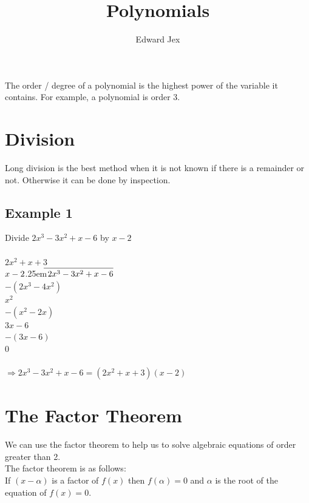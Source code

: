 \documentclass[a4paper,12pt]{article}
\newcommand\longdiv[2]{%
$\strut#1$\kern.25em\smash{\raise.3ex\hbox{$\big)$}}$\mkern-8mu
        \overline{\enspace\strut#2}$}
\begin{document}
\title{Polynomials}	
\author{Edward Jex}
\maketitle

The order / degree of a polynomial is the highest power of the variable it contains. For example, a polynomial is order 3. \\
\section*{Division}
Long division is the best method when it is not known if there is a remainder or not. Otherwise it can  be done by inspection. \\
\subsection*{Example 1}
Divide $2x^3 -3x^2 + x -6$ by $x-2$ \\\\
\phantom{A}\hspace{0.8cm} $2x^2 + x + 3$ \\
\longdiv{x-2}{2x^3 -3x^2 + x -6} \\
\phantom{A}\hspace{0.3cm} $-(2x^3 -4x^2)$ \\
\phantom{A}\hspace{2.1cm} $x^2$ \\
\phantom{A}\hspace{1.6cm} $-(x^2-2x)$ \\
\phantom{A}\hspace{3cm} $3x-6$ \\
\phantom{A}\hspace{2.5cm} $-(3x-6)$ \\
\phantom{A}\hspace{4cm} $0$ \\\\
$\Rightarrow 2x^3 -3x^2 + x -6 = (2x^2 + x + 3)(x-2)$
\section*{The Factor Theorem}
We can use the factor theorem to help us to solve algebraic equations of order greater than 2. \\
The factor theorem is as follows: \\
If $(x-\alpha)$ is a factor of $f(x)$ then $f(\alpha) = 0$ and $\alpha$ is the root of the equation of $f(x) = 0$. \\
\end{document}
